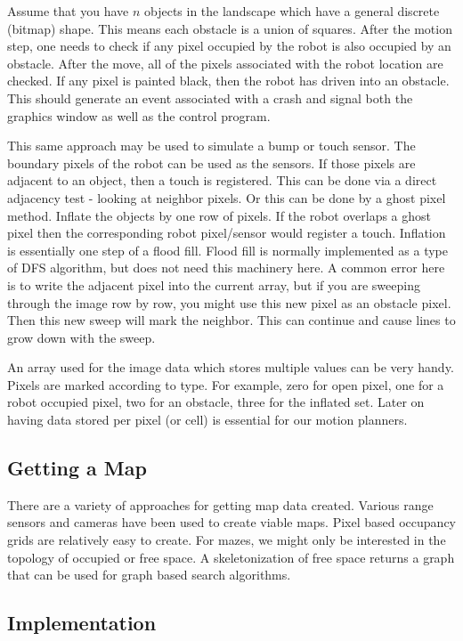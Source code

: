 Assume that you have \(n\) objects in the landscape which have a general
discrete (bitmap) shape. This means each obstacle is a union of squares.
After the motion step, one needs to check if any pixel occupied by the
robot is also occupied by an obstacle. After the move, all of the pixels
associated with the robot location are checked. If any pixel is painted
black, then the robot has driven into an obstacle. This should generate
an event associated with a crash and signal both the graphics window as
well as the control program.

This same approach may be used to simulate a bump or touch sensor. The
boundary pixels of the robot can be used as the sensors. If those pixels
are adjacent to an object, then a touch is registered. This can be done
via a direct adjacency test - looking at neighbor pixels. Or this can be
done by a ghost pixel method. Inflate the objects by one row of pixels.
If the robot overlaps a ghost pixel then the corresponding robot
pixel/sensor would register a touch. Inflation is essentially one step
of a flood fill. Flood fill is normally implemented as a type of DFS
algorithm, but does not need this machinery here. A common error here is
to write the adjacent pixel into the current array, but if you are
sweeping through the image row by row, you might use this new pixel as
an obstacle pixel. Then this new sweep will mark the neighbor. This can
continue and cause lines to grow down with the sweep.

An array used for the image data which stores multiple values can be
very handy. Pixels are marked according to type. For example, zero for
open pixel, one for a robot occupied pixel, two for an obstacle, three
for the inflated set. Later on having data stored per pixel (or cell) is
essential for our motion planners.

\hypertarget{getting-a-map}{%
\subsection{Getting a Map}\label{getting-a-map}}

There are a variety of approaches for getting map data created. Various
range sensors and cameras have been used to create viable maps. Pixel
based occupancy grids are relatively easy to create. For mazes, we might
only be interested in the topology of occupied or free space. A
skeletonization of free space returns a graph that can be used for graph
based search algorithms.

\hypertarget{implementation}{%
\subsection{Implementation}\label{implementation}}

